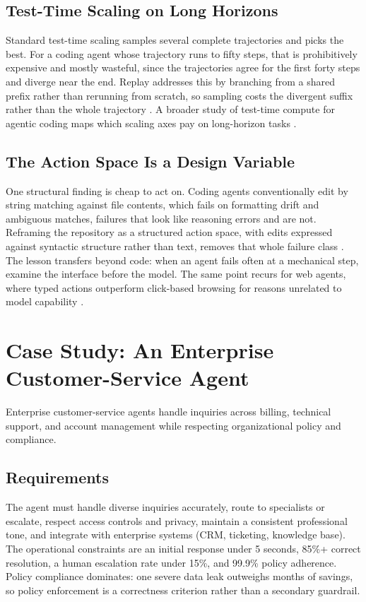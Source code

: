 \documentclass[11pt]{book}
\begin{document}
\subsection{Test-Time Scaling on Long Horizons}

Standard test-time scaling samples several complete trajectories and picks the best. For a coding agent whose trajectory runs to fifty steps, that is prohibitively expensive and mostly wasteful, since the trajectories agree for the first forty steps and diverge near the end. Replay addresses this by branching from a shared prefix rather than rerunning from scratch, so sampling costs the divergent suffix rather than the whole trajectory \cite{swereplay2026}. A broader study of test-time compute for agentic coding maps which scaling axes pay on long-horizon tasks \cite{ttscoding2026}.

\subsection{The Action Space Is a Design Variable}

One structural finding is cheap to act on. Coding agents conventionally edit by string matching against file contents, which fails on formatting drift and ambiguous matches, failures that look like reasoning errors and are not. Reframing the repository as a structured action space, with edits expressed against syntactic structure rather than text, removes that whole failure class \cite{codestruct2026}. The lesson transfers beyond code: when an agent fails often at a mechanical step, examine the interface before the model. The same point recurs for web agents, where typed actions outperform click-based browsing for reasons unrelated to model capability \cite{typedactions2026}.

\section{Case Study: An Enterprise Customer-Service Agent}

Enterprise customer-service agents handle inquiries across billing, technical support, and account management while respecting organizational policy and compliance.

\subsection{Requirements}

The agent must handle diverse inquiries accurately, route to specialists or escalate, respect access controls and privacy, maintain a consistent professional tone, and integrate with enterprise systems (CRM, ticketing, knowledge base). The operational constraints are an initial response under 5 seconds, 85\%+ correct resolution, a human escalation rate under 15\%, and 99.9\% policy adherence. Policy compliance dominates: one severe data leak outweighs months of savings, so policy enforcement is a correctness criterion rather than a secondary guardrail.
\end{document}
